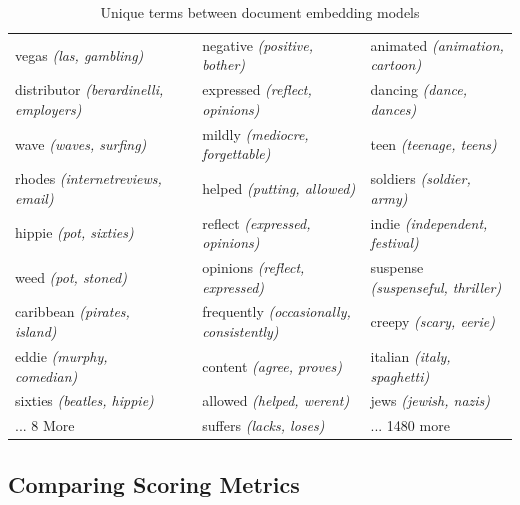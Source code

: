 {\begin{landscape}
\begin{table}[]
\begin{tabular}{llll}
			vegas \textit{(las, gambling)}                 &                          & negative \textit{(positive, bother)}             & animated \textit{(animation, cartoon)}           \\
			distributor \textit{(berardinelli, employers)} &                          & expressed \textit{(reflect, opinions)}           & dancing \textit{(dance, dances)}                 \\
			wave \textit{(waves, surfing)}                 &                          & mildly \textit{(mediocre, forgettable)}          & teen \textit{(teenage, teens)}                   \\
			rhodes \textit{(internetreviews, email)}       &                          & helped \textit{(putting, allowed)}               & soldiers \textit{(soldier, army)}                \\
			hippie \textit{(pot, sixties)}                 &                          & reflect \textit{(expressed, opinions)}           & indie \textit{(independent, festival)}           \\
			weed \textit{(pot, stoned)}                    &                          & opinions \textit{(reflect, expressed)}           & suspense \textit{(suspenseful, thriller)}        \\
			caribbean \textit{(pirates, island)}           &                          & frequently \textit{(occasionally, consistently)} & creepy \textit{(scary, eerie)}                   \\
			eddie \textit{(murphy, comedian)}              &                          & content \textit{(agree, proves)}                 & italian \textit{(italy, spaghetti)}              \\
			sixties \textit{(beatles, hippie)}             &                          & allowed \textit{(helped, werent)}                & jews \textit{(jewish, nazis)}                    \\
			... 8 More                   		  &                          & suffers \textit{(lacks, loses)}                  & ... 1480 more               
		\end{tabular}
		\caption{Unique terms between document embedding models}\label{ch3:ComparingSpaceTypes}
	\end{table}
\end{landscape}
}

\subsection{Comparing Scoring Metrics}\label{ch3:scoringmetrics}

